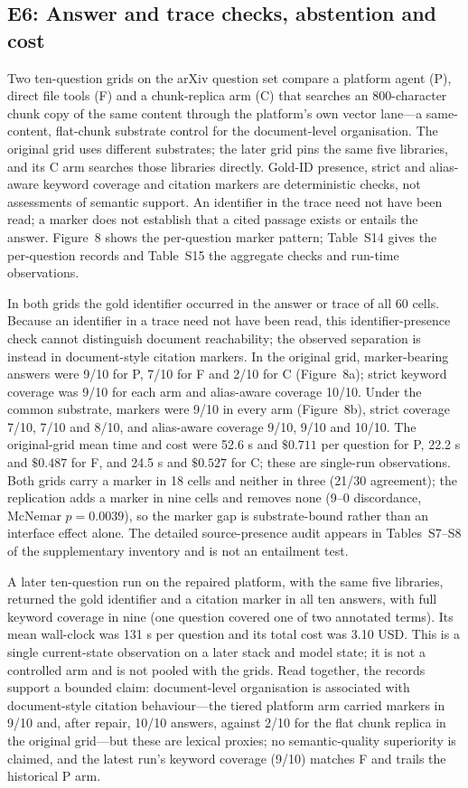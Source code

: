 \documentclass[11pt]{article}
\begin{document}
\subsection{E6: Answer and trace checks, abstention and cost}


Two ten-question grids on the arXiv question set compare a platform agent
(P), direct file tools (F)
and a chunk-replica arm (C) that searches an 800-character chunk copy of the
same content through the platform's own vector lane---a same-content,
flat-chunk substrate control for the document-level organisation. The
original grid uses different substrates; the later grid pins the same five
libraries, and its C arm searches those libraries directly. Gold-ID
presence, strict and alias-aware keyword coverage and citation markers are
deterministic checks, not assessments of semantic support. An identifier in
the trace need not have been read; a marker does not establish that a cited
passage exists or entails the answer. Figure~8 shows the
per-question marker pattern; Table~S14 gives the per-question records and
Table~S15 the aggregate checks and run-time observations.

In both grids the gold identifier occurred in the answer or trace of all 60
cells. Because an identifier in a trace need not have been read, this
identifier-presence check cannot distinguish document reachability; the
observed separation is instead in document-style citation markers. In the
original grid, marker-bearing
answers were 9/10 for P, 7/10 for F and 2/10 for C
(Figure~8a); strict keyword coverage was 9/10 for each arm
and alias-aware coverage 10/10. Under the common substrate, markers were
9/10 in every arm (Figure~8b), strict coverage 7/10, 7/10
and 8/10, and alias-aware coverage 9/10, 9/10 and 10/10. The original-grid
mean time and cost were 52.6 s and $\$0.711$ per question for P, 22.2 s and
$\$0.487$ for F, and 24.5 s and $\$0.527$ for C; these are single-run
observations. Both grids carry a marker in 18 cells and neither in three
(21/30 agreement); the replication adds a marker in nine cells and removes
none (9--0 discordance, McNemar $p=0.0039$), so the marker gap is
substrate-bound rather than an interface
effect alone. The detailed source-presence audit appears in Tables~S7--S8
of the supplementary inventory and is not an entailment test.

A later ten-question run on the repaired platform, with the same five
libraries, returned the gold identifier and a citation marker in all ten
answers, with full keyword coverage in nine (one question covered one of
two annotated terms). Its mean wall-clock was 131 s per question and its
total cost was 3.10 USD. This is a single current-state observation on a
later stack and model state; it is not a controlled arm and is not pooled
with the grids. Read together, the records support a bounded claim:
document-level organisation is associated with document-style citation
behaviour---the tiered platform arm carried markers in 9/10 and, after
repair, 10/10 answers, against 2/10 for the flat chunk replica in the
original grid---but these are lexical proxies; no semantic-quality
superiority is claimed, and the latest run's keyword coverage (9/10) matches
F and trails the historical P arm.
\end{document}
